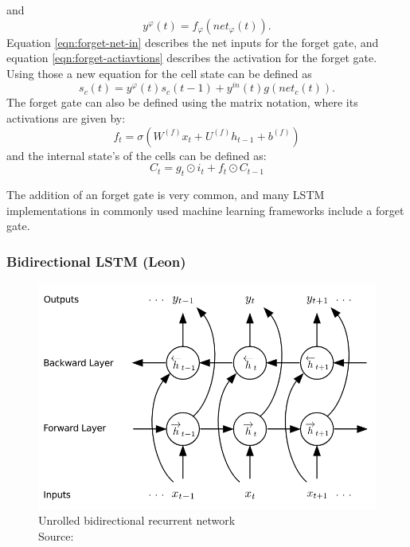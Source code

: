 \documentclass[twoside,a4paper,10pt,DIV=12,BCOR=12mm]{scrartcl}
\begin{document}
and
\begin{equation}
    y^\varphi(t)=f_\varphi\left(net_\varphi(t)\right).
    \label{eqn:forget-actiavtions}
\end{equation} 
Equation \ref{eqn:forget-net-in} describes the net inputs for the forget gate, and equation \ref{eqn:forget-actiavtions} describes the activation for the forget gate. Using those a new equation for the cell state can be defined as\cite{gers1999forgetgate}
\begin{equation}
    s_c(t)=y^\varphi(t)s_c(t-1)+y^{in}(t)g\left(net_c(t)\right).    
\end{equation}
The forget gate can also be defined using the matrix notation, where its activations are given by:\cite{smagulova2019notation}
$$f_t=\sigma\left(W^{(f)}x_t+U^{(f)}h_{t-1}+b^{(f)}\right)$$
and the internal state's of the cells can be defined as:\cite{smagulova2019notation}
$$C_t=g_t\odot i_t+f_t\odot C_{t-1}$$

The addition of an forget gate is very common, and many LSTM implementations in commonly used machine learning frameworks include a forget gate.\cite{smagulova2019notation,keras-lstm, real-pytorch-lstm, pytorch-lstm} 

\subsubsection{Bidirectional LSTM (Leon)}

\begin{figure}[h!]
    \centering
    \includegraphics[height=7.5cm]{brnn.png}
    \caption{Unrolled bidirectional recurrent network\\ Source: \cite{graves2013speechrecognitiondeeprecurrent}}
    \label{fig:brnn}
\end{figure}
\end{document}
